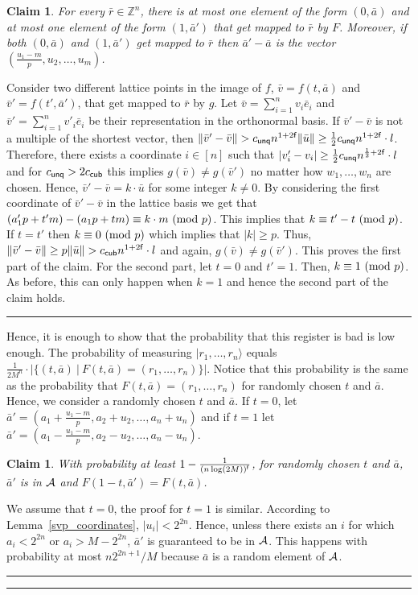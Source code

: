\documentclass[11pt]{article}
\newtheorem{claim}[theorem]{Claim}
\newcommand{\qedsymb}{\hfill{\rule{2mm}{2mm}}}
\newenvironment{proof}{\begin{trivlist}
\item[\hspace{\labelsep}{\sl\noindent Proof:\/}]
}{\qedsymb\end{trivlist}}
\def\Z{\mathbb{Z}}
\def\mod{{\rm mod}}
\def\half{{\frac{1}{2}}}
\newcommand\ket[1]{{ |{#1} \rangle }}
\newcommand\C[1]{{ c_{\sf {#1}} }}
\begin{document}
\begin{proof}
\begin{claim}
For every $\bar{r} \in \Z^n$, there is at most one element of the form $(0,\bar{a})$ and at most one element of the
form $(1,\bar{a}')$ that get mapped to $\bar{r}$ by $F$. Moreover, if both $(0,\bar{a})$ and $(1,\bar{a}')$ get mapped
to $\bar{r}$ then $\bar{a}'-\bar{a}$ is the vector $(\frac{u_1-m}{p},u_2,\ldots,u_m)$.
\end{claim}
\begin{proof}
Consider two different lattice points in the image of $f$, $\bar{v}=f(t,\bar{a})$ and $\bar{v}'=f(t',\bar{a}')$, that
get mapped to $\bar{r}$ by $g$. Let $\bar{v}=\sum_{i=1}^n v_i \bar{e}_i$ and $\bar{v}'=\sum_{i=1}^n v'_i \bar{e}_i$ be
their representation in the orthonormal basis. If $\bar{v}'-\bar{v}$ is not a multiple of the shortest vector, then
$\|\bar{v}'-\bar{v}\| > \C{unq} n^{1+2{\sf f}} \|\bar{u}\| \ge \frac{1}{2} \C{unq} n^{1+2{\sf f}} \cdot l$. Therefore,
there exists a coordinate $i\in [n]$ such that $|v'_i-v_i| \ge \frac{1}{2} \C{unq} n^{\half+2{\sf f}} \cdot l$ and for
$\C{unq} > 2\C{cub}$ this implies $g(\bar{v}) \neq g(\bar{v}')$ no matter how $w_1,\ldots,w_n$ are chosen. Hence,
$\bar{v}'-\bar{v} = k\cdot \bar{u}$ for some integer $k\neq 0$. By considering the first coordinate of
$\bar{v}'-\bar{v}$ in the lattice basis we get that $(a'_1 p + t'm)-(a_1 p + tm) \equiv k\cdot m~(\mod~p)$. This
implies that $k \equiv t'-t~(\mod~p)$. If $t=t'$ then $k\equiv 0~(\mod~p)$ which implies that $|k| \ge p$. Thus,
$\|\bar{v}'-\bar{v}\| \ge p\|\bar{u}\| > \C{cub} n^{1+2{\sf f}} \cdot l$ and again, $g(\bar{v})\neq g(\bar{v}')$. This
proves the first part of the claim. For the second part, let $t=0$ and $t'=1$. Then, $k \equiv 1~(\mod~p)$. As before,
this can only happen when $k=1$ and hence the second part of the claim holds.
\end{proof}

Hence, it is enough to show that the probability that this register is bad is low enough. The probability of measuring
$\ket{r_1,\ldots,r_n}$ equals $\frac{1}{2M^n} \cdot |\{ (t,\bar{a}) ~|~ F(t,\bar{a})=(r_1,\ldots,r_n) \}|$. Notice that
this probability is the same as the probability that $F(t,\bar{a})=(r_1,\ldots,r_n)$ for randomly chosen $t$ and
$\bar{a}$. Hence, we consider a randomly chosen $t$ and $\bar{a}$. If $t=0$, let
$\bar{a}'=(a_1+\frac{u_1-m}{p},a_2+u_2,\dots,a_n+u_n)$ and if $t=1$ let
$\bar{a}'=(a_1-\frac{u_1-m}{p},a_2-u_2,\dots,a_n-u_n)$.

\begin{claim}
With probability at least $1-\frac{1}{(n\log (2M))^{\sf f}}$, for randomly chosen $t$ and $\bar{a}$, $\bar{a}'$ is in
${\cal A}$ and $F(1-t, \bar{a}') = F(t,\bar{a})$.
\end{claim}
\begin{proof}
We assume that $t=0$, the proof for $t=1$ is similar. According to Lemma~\ref{svp_coordinates}, $|u_i| < 2^{2n}$.
Hence, unless there exists an $i$ for which $a_i < 2^{2n}$ or $a_i > M-2^{2n}$, $\bar{a}'$ is guaranteed to be in
${\cal A}$. This happens with probability at most $n2^{2n+1}/M$ because $\bar{a}$ is a random element of ${\cal A}$.


\end{proof}
\end{proof}
\end{document}
